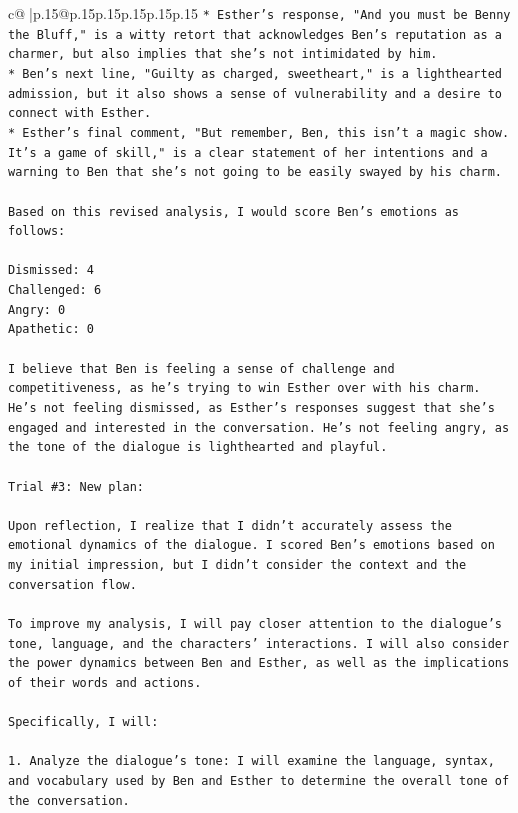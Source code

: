 \documentclass{article}
\begin{document}
{\begin{supertabular}{c@{$\;$}|p{.15\linewidth}@{}p{.15\linewidth}p{.15\linewidth}p{.15\linewidth}p{.15\linewidth}p{.15\linewidth}}
{{{\texttt{* Esther's response, "And you must be Benny the Bluff," is a witty retort that acknowledges Ben's reputation as a charmer, but also implies that she's not intimidated by him.} \\
\texttt{* Ben's next line, "Guilty as charged, sweetheart," is a lighthearted admission, but it also shows a sense of vulnerability and a desire to connect with Esther.} \\
\texttt{* Esther's final comment, "But remember, Ben, this isn't a magic show. It's a game of skill," is a clear statement of her intentions and a warning to Ben that she's not going to be easily swayed by his charm.} \\
\\ 
\texttt{Based on this revised analysis, I would score Ben's emotions as follows:} \\
\\ 
\texttt{Dismissed: 4} \\
\texttt{Challenged: 6} \\
\texttt{Angry: 0} \\
\texttt{Apathetic: 0} \\
\\ 
\texttt{I believe that Ben is feeling a sense of challenge and competitiveness, as he's trying to win Esther over with his charm. He's not feeling dismissed, as Esther's responses suggest that she's engaged and interested in the conversation. He's not feeling angry, as the tone of the dialogue is lighthearted and playful.} \\
\\ 
\texttt{Trial \#3: New plan: } \\
\\ 
\texttt{Upon reflection, I realize that I didn't accurately assess the emotional dynamics of the dialogue. I scored Ben's emotions based on my initial impression, but I didn't consider the context and the conversation flow. } \\
\\ 
\texttt{To improve my analysis, I will pay closer attention to the dialogue's tone, language, and the characters' interactions. I will also consider the power dynamics between Ben and Esther, as well as the implications of their words and actions.} \\
\\ 
\texttt{Specifically, I will:} \\
\\ 
\texttt{1. Analyze the dialogue's tone: I will examine the language, syntax, and vocabulary used by Ben and Esther to determine the overall tone of the conversation.} \\
}}}
\end{supertabular}}
\end{document}
